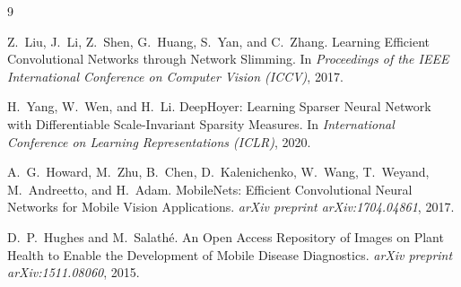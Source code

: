 \documentclass[11pt]{article}
\begin{document}
\begin{thebibliography}{9}

Z.~Liu, J.~Li, Z.~Shen, G.~Huang, S.~Yan, and C.~Zhang.
\newblock Learning Efficient Convolutional Networks through Network Slimming.
\newblock In \emph{Proceedings of the IEEE International Conference on Computer Vision (ICCV)}, 2017.

H.~Yang, W.~Wen, and H.~Li.
\newblock DeepHoyer: Learning Sparser Neural Network with Differentiable Scale-Invariant Sparsity Measures.
\newblock In \emph{International Conference on Learning Representations (ICLR)}, 2020.

A.~G.~Howard, M.~Zhu, B.~Chen, D.~Kalenichenko, W.~Wang, T.~Weyand, M.~Andreetto, and H.~Adam.
\newblock MobileNets: Efficient Convolutional Neural Networks for Mobile Vision Applications.
\newblock \emph{arXiv preprint arXiv:1704.04861}, 2017.

D.~P.~Hughes and M.~Salath\'e.
\newblock An Open Access Repository of Images on Plant Health to Enable the Development of Mobile Disease Diagnostics.
\newblock \emph{arXiv preprint arXiv:1511.08060}, 2015.

\end{thebibliography}
\end{document}
